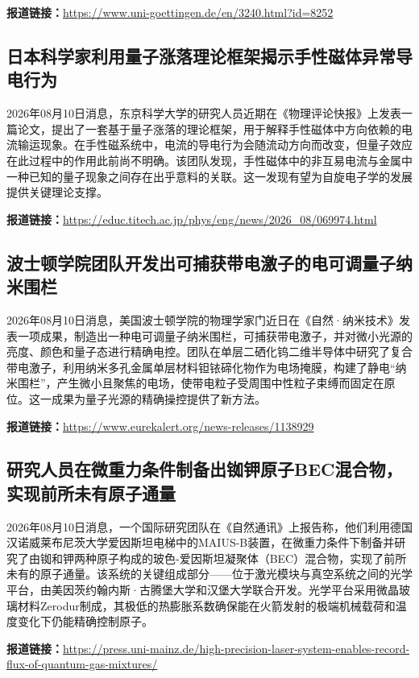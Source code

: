 \documentclass[12pt,a4paper]{ctexart}
\begin{document}
\noindent\textbf{报道链接：}\url{https://www.uni-goettingen.de/en/3240.html?id=8252}

\subsection{ 日本科学家利用量子涨落理论框架揭示手性磁体异常导电行为 }

2026年08月10日消息，东京科学大学的研究人员近期在《物理评论快报》上发表一篇论文，提出了一套基于量子涨落的理论框架，用于解释手性磁体中方向依赖的电流输运现象。在手性磁系统中，电流的导电行为会随流动方向而改变，但量子效应在此过程中的作用此前尚不明确。该团队发现，手性磁体中的非互易电流与金属中一种已知的量子现象之间存在出乎意料的关联。这一发现有望为自旋电子学的发展提供关键理论支撑。

\noindent\textbf{报道链接：}\url{https://educ.titech.ac.jp/phys/eng/news/2026\_08/069974.html}

\subsection{ 波士顿学院团队开发出可捕获带电激子的电可调量子纳米围栏 }

2026年08月10日消息，美国波士顿学院的物理学家门近日在《自然·纳米技术》发表一项成果，制造出一种电可调量子纳米围栏，可捕获带电激子，并对微小光源的亮度、颜色和量子态进行精确电控。团队在单层二硒化钨二维半导体中研究了复合带电激子，利用纳米多孔金属单层材料钽铱碲化物作为电场掩膜，构建了静电“纳米围栏”，产生微小且聚焦的电场，使带电粒子受周围中性粒子束缚而固定在原位。这一成果为量子光源的精确操控提供了新方法。

\noindent\textbf{报道链接：}\url{https://www.eurekalert.org/news-releases/1138929}

\subsection{ 研究人员在微重力条件制备出铷钾原子BEC混合物，实现前所未有原子通量 }

2026年08月10日消息，一个国际研究团队在《自然通讯》上报告称，他们利用德国汉诺威莱布尼茨大学爱因斯坦电梯中的MAIUS-B装置，在微重力条件下制备并研究了由铷和钾两种原子构成的玻色-爱因斯坦凝聚体（BEC）混合物，实现了前所未有的原子通量。该系统的关键组成部分——位于激光模块与真空系统之间的光学平台，由美因茨约翰内斯·古腾堡大学和汉堡大学联合开发。光学平台采用微晶玻璃材料Zerodur制成，其极低的热膨胀系数确保能在火箭发射的极端机械载荷和温度变化下仍能精确控制原子。

\noindent\textbf{报道链接：}\url{https://press.uni-mainz.de/high-precision-laser-system-enables-record-flux-of-quantum-gas-mixtures/}
\end{document}
